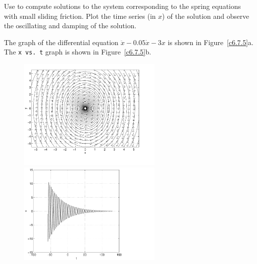 \documentclass{ximera}
\begin{document}
\begin{computerExercise} \label{c6.7.5}
Use {\pplane} to compute solutions to the system corresponding to the
spring equations with small sliding friction.  Plot the time series (in $x$)
of the solution and observe the oscillating and damping of the solution.

\begin{solution}

The {\pplane} graph of the differential equation
$\ddot{x} - 0.05\dot{x} - 3x$ is shown in Figure~\ref{c6.7.5}a.  The
{\tt x vs.\ t} graph is shown in Figure~\ref{c6.7.5}b.

\begin{figure}[htb]
                       \centerline{%
                       \includegraphics[width=2.75in]{exfigure/6-10-5a.pdf}
                       \includegraphics[width=2.75in]{exfigure/6-10-5b.pdf}}
\end{figure}























\end{solution}
\end{computerExercise}
\end{document}
